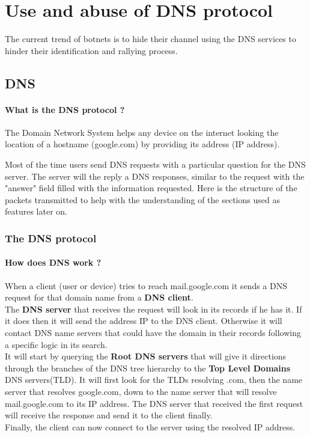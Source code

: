 \newpage

\section{Use and abuse of DNS protocol}
The current trend of botnets is to hide their channel using the DNS services to hinder their identification and rallying process.\\

\subsection{DNS}
\paragraph{What is the DNS protocol ?}
The Domain Network System helps any device on the internet looking the location of a hostname (google.com) by providing its address (IP address).


Most of the time users send DNS requests with a particular question for the DNS server. The server will the reply a DNS responses, similar to the request with the "answer" field filled with the information requested. Here is the structure of the packets transmitted to help with the understanding of the sections used as features later on.
\subsubsection{The DNS protocol}
\paragraph{How does DNS work ?}
When a client (user or device) tries to reach mail.google.com it sends a DNS request for that domain name from a \textbf{DNS client}.\\
The \textbf{DNS server} that receives the request will look in its records if he has it. If it does then it will send the address IP to the DNS client. Otherwise it will contact DNS name servers that could have the domain in their records following a specific logic in its search.\\
It will start by querying the \textbf{Root DNS servers} that will give it directions through the branches of the DNS tree hierarchy to the \textbf{Top Level Domains} DNS servers(TLD). It will first look for the TLDs resolving .com, then the name server that resolves google.com, down to the name server that will resolve mail.google.com to its IP address. The DNS server that received the first request will receive the response and send it to the client finally.\\
Finally, the client can now connect to the server using the resolved IP address.\\
